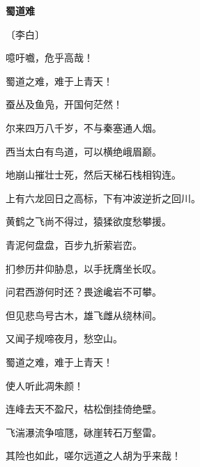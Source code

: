 \documentclass[12pt,UTF-8,openany,fontset=none]{ctexbook}
\begin{document}

\begin{center}
    {\bfseries 蜀道难}

    \vspace{18pt}

    \begin{large}\xuwen
        〔李白〕
    \end{large}

\end{center}

    \vspace{18pt}  %

\begin{center}
    \begin{Large}

        \hspace{16pt}噫吁嚱，危乎高哉！
        
        \hspace{16pt}蜀道之难，难于上青天！

        蚕丛及鱼凫，开国何茫然！

        尔来四万八千岁，不与秦塞通人烟。

        西当太白有鸟道，可以横绝峨眉巅。

        \hspace{34pt}地崩山摧壮士死，然后天梯石栈相钩连。

        上有六龙回日之高标，下有冲波逆折之回川。

        黄鹤之飞尚不得过，猿猱欲度愁攀援。

        \hspace{34pt}青泥何盘盘，百步九折萦岩峦。

        扪参历井仰胁息，以手抚膺坐长叹。

        问君西游何时还？畏途巉岩不可攀。

        但见悲鸟号古木，雄飞雌从绕林间。

        又闻子规啼夜月，愁空山。\hspace{58pt}

        \hspace{16pt}蜀道之难，难于上青天！
        
        使人听此凋朱颜！\phantom{日日日日日日日}\hspace{6pt}

        连峰去天不盈尺，枯松倒挂倚绝壁。

        飞湍瀑流争喧豗，砯崖转石万壑雷。

        其险也如此，嗟尔远道之人胡为乎来哉！


\end{Large}
\end{center}
\end{document}
